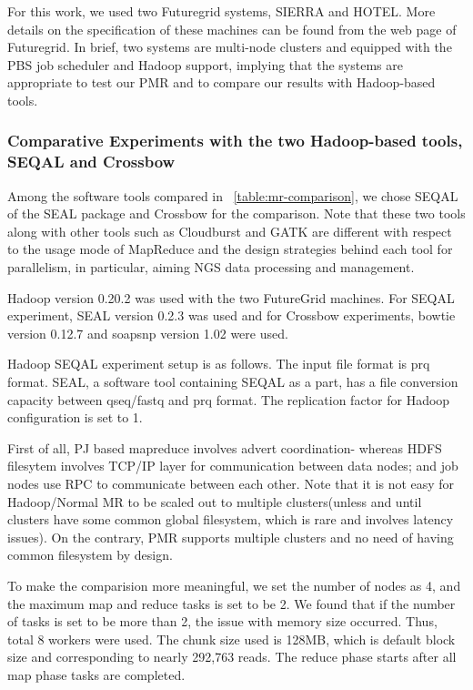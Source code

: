 \documentclass{sig-alternate}
\begin{document}
For this work, we used two Futuregrid systems, SIERRA and HOTEL.  More details on the specification of these machines can be found from the web page of Futuregrid\cite{futuregrid_url}.  In brief, two systems are multi-node clusters and equipped with the PBS job scheduler and Hadoop support, implying that the systems are appropriate to test our PMR and to compare our results with Hadoop-based tools.

\subsubsection{Comparative Experiments with the two Hadoop-based tools, SEQAL and Crossbow}
Among the software tools compared in ~\ref{table:mr-comparison}, we chose SEQAL of the SEAL package and Crossbow for the comparison.  Note that these two tools along with other tools such as Cloudburst and GATK are different with respect to the usage mode of MapReduce and the design strategies behind each tool for parallelism, in particular, aiming NGS data processing and management.  

Hadoop version 0.20.2 was used with the two FutureGrid machines.  For SEQAL experiment, SEAL version 0.2.3 was used and for Crossbow experiments, bowtie version 0.12.7 and soapsnp version 1.02 were used.

Hadoop SEQAL experiment setup is as follows.  The input file format is prq format.  SEAL, a software tool containing SEQAL as a part, has a file conversion capacity between qseq/fastq and prq format.  The replication factor for Hadoop configuration is set  to 1.

First of all, PJ based mapreduce involves advert coordination- whereas HDFS filesytem involves TCP/IP layer for communication between data nodes; and job nodes use RPC to communicate between each other.
Note that it is not easy for Hadoop/Normal MR to be scaled out to multiple clusters(unless and until clusters have some common global filesystem, which is rare and involves latency issues).  On the contrary, PMR supports  multiple clusters and no need of having common filesystem by design.

To make the comparision more meaningful, we set the number of nodes as 4, and the maximum map and reduce tasks is set to be 2.  We found that if the number of tasks is set to be more than 2, the issue with memory size occurred.    Thus, total 8 workers were used.
The chunk size used is 128MB, which is default block size and corresponding to nearly 292,763 reads.
The reduce phase starts after all map phase tasks are completed. 
\end{document}
